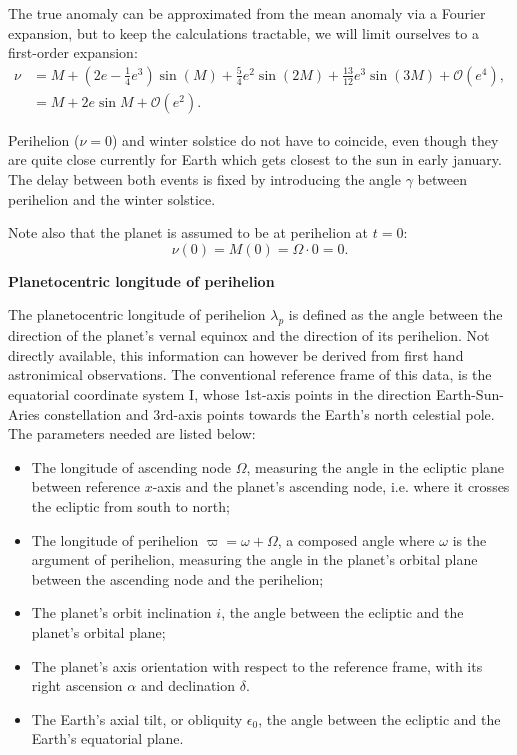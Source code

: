 \documentclass[12pt]{article}
\begin{document}
The true anomaly can be approximated from the mean anomaly
via a Fourier expansion, but to keep the calculations tractable, we will 
limit ourselves to a first-order expansion:
\begin{align}
    \nu &= M + (2e - \tfrac{1}{4}e^3)\sin(M) + \tfrac{5}{4}e^2 \sin(2M) + 
    \tfrac{13}{12}e^3 \sin(3M) + \mathcal{O}(e^4),\\
    &= M + 2e \sin M + \mathcal{O}(e^2).\label{eq:nu_first_order}
\end{align}

Perihelion ($\nu=0$) and winter solstice do not have to coincide,
even though they are quite close currently for Earth which gets closest to the 
sun in early january. The delay between both events is fixed by introducing 
the angle $\gamma$ between perihelion and the winter solstice.

Note also that the planet is assumed to be at perihelion at $t=0$:
\begin{equation}
    \nu(0) = M(0) = \Omega \cdot 0 = 0.
\end{equation} 

\textbf{Planetocentric longitude of perihelion}

The planetocentric longitude of perihelion $\lambda_p$ is defined as the angle
between the direction of the planet's vernal equinox and the direction of its
perihelion.
Not directly available, this information can however be derived 
from first hand astronimical observations. 
The conventional reference frame of this data, is the equatorial coordinate 
system $\mathrm{I}$, whose 1st-axis points in the direction Earth-Sun-Aries 
constellation and 3rd-axis points towards the Earth's north celestial pole.
The parameters needed are listed below: 

\begin{itemize}
    \item The longitude of ascending node $\Omega$, measuring the angle in the 
        ecliptic plane between reference $x$-axis and the planet's ascending 
        node, i.e. where it crosses the ecliptic from south to north;
    \item The longitude of perihelion $\varpi=\omega+\Omega$, a composed angle 
        where $\omega$ is the argument of perihelion, measuring the angle 
        in the planet's orbital plane between the ascending node and the 
        perihelion;
    \item The planet's orbit inclination $i$, the angle between the ecliptic 
        and the planet's orbital plane;
    \item The planet's axis orientation with respect to the reference frame, 
        with its right ascension $\alpha$ and declination $\delta$.
    \item The Earth's axial tilt, or obliquity $\epsilon_0$, the angle between the ecliptic 
        and the Earth's equatorial plane.
\end{itemize}
\end{document}
